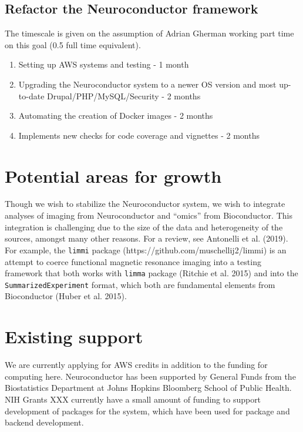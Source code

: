 \documentclass[]{elsarticle} %
\providecommand{\tightlist}{%
  \setlength{\itemsep}{0pt}\setlength{\parskip}{0pt}}
\begin{document}
\hypertarget{refactor-the-neuroconductor-framework-1}{%
\subsection{Refactor the Neuroconductor framework}\label{refactor-the-neuroconductor-framework-1}}

The timescale is given on the assumption of Adrian Gherman working part
time on this goal (0.5 full time equivalent).

\begin{enumerate}
\def\labelenumi{\arabic{enumi}.}
\tightlist
\item
  Setting up AWS systems and testing - 1 month
\item
  Upgrading the Neuroconductor system to a newer OS version and most up-to-date Drupal/PHP/MySQL/Security - 2 months
\item
  Automating the creation of Docker images - 2 months
\item
  Implements new checks for code coverage and vignettes - 2 months
\end{enumerate}

\hypertarget{potential-areas-for-growth}{%
\section{Potential areas for growth}\label{potential-areas-for-growth}}

Though we wish to stabilize the Neuroconductor system, we wish to integrate analyses of imaging from Neuroconductor and ``omics'' from Bioconductor. This integration is challenging due to the size of the data and heterogeneity of the sources, amongst many other reasons. For a review, see Antonelli et al. (2019). For example, the \texttt{limmi} package (https://github.com/muschellij2/limmi) is an attempt to coerce functional magnetic resonance imaging into a testing framework that both works with \texttt{limma} package (Ritchie et al. 2015) and into the \texttt{SummarizedExperiment} format, which both are fundamental elements from Bioconductor (Huber et al. 2015).

\hypertarget{existing-support}{%
\section{Existing support}\label{existing-support}}

We are currently applying for AWS credits in addition to the funding for computing here. Neuroconductor has been supported by General Funds from the Biostatistics Department at Johns Hopkins Bloomberg School of Public Health. NIH Grants XXX currently have a small amount of funding to support development of packages for the system, which have been used for package and backend development.
\end{document}
